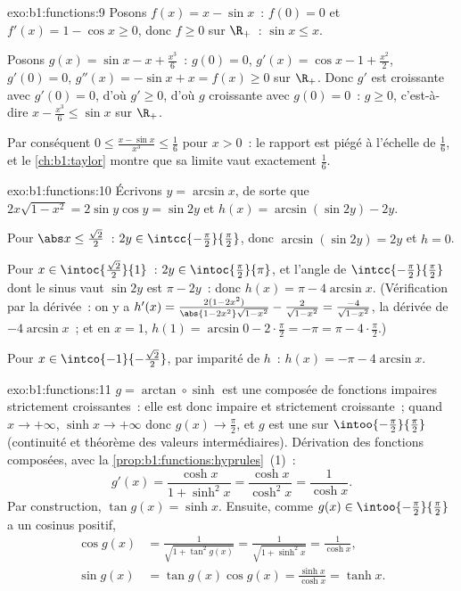 \begin{solution}{exo:b1:functions:9}
Posons $f(x) = x - \sin x$~: $f(0) = 0$ et $f'(x) = 1 - \cos x \geq
0$, donc $f \geq 0$ sur $\R_+$~: $\sin x \leq x$.

Posons $g(x) = \sin x - x + \frac{x^3}{6}$~: $g(0) = 0$, $g'(x) =
\cos x - 1 + \frac{x^2}{2}$, $g'(0) = 0$, $g''(x) = -\sin x + x =
f(x) \geq 0$ sur $\R_+$. Donc $g'$ est croissante avec $g'(0) = 0$,
d'où $g' \geq 0$, d'où $g$ croissante avec $g(0) = 0$~: $g \geq 0$,
c'est-à-dire $x - \frac{x^3}{6} \leq \sin x$ sur $\R_+$.

Par conséquent $0 \leq \frac{x - \sin x}{x^3} \leq \frac 16$ pour
$x > 0$~: le rapport est piégé à l'échelle de $\frac16$, et le
\cref{ch:b1:taylor} montre que sa limite vaut exactement $\frac 16$.
\end{solution}

\begin{solution}{exo:b1:functions:10}
Écrivons $y = \arcsin x$, de sorte que $2x\sqrt{1 - x^2} = 2\sin y\cos
y = \sin 2y$ et $h(x) = \arcsin(\sin 2y) - 2y$.

Pour $\abs x \leq \frac{\sqrt 2}{2}$~: $2y \in
\intcc{-\frac\pi2}{\frac\pi2}$, donc $\arcsin(\sin 2y) = 2y$ et
$h = 0$.

Pour $x \in \intoc{\frac{\sqrt 2}{2}}{1}$~: $2y \in
\intoc{\frac\pi2}{\pi}$, et l'angle de
$\intcc{-\frac\pi2}{\frac\pi2}$ dont le sinus vaut $\sin 2y$ est
$\pi - 2y$~: donc $h(x) = \pi - 4\arcsin x$. (Vérification par la
dérivée~: on y a
$h'(x) = \frac{2(1 - 2x^2)}{\abs{1 - 2x^2}\sqrt{1 - x^2}} -
\frac{2}{\sqrt{1-x^2}} = \frac{-4}{\sqrt{1 - x^2}}$, la dérivée
de $-4\arcsin x$~; et en $x = 1$, $h(1) = \arcsin 0 - 2\cdot\frac\pi2
= -\pi = \pi - 4\cdot\frac\pi2$.)

Pour $x \in \intco{-1}{-\frac{\sqrt 2}{2}}$, par imparité de $h$~:
$h(x) = -\pi - 4\arcsin x$.
\end{solution}

\begin{solution}{exo:b1:functions:11}
$g = \arctan \circ \sinh$ est une composée de fonctions impaires
strictement croissantes~: elle est donc impaire et strictement
croissante~; quand $x \to +\infty$, $\sinh x \to +\infty$ donc
$g(x) \to \frac\pi2$, et $g$ est une  sur
$\intoo{-\frac\pi2}{\frac\pi2}$ (continuité et théorème des valeurs
intermédiaires). Dérivation des fonctions composées, avec la
\cref{prop:b1:functions:hyprules}~(1)~:
\[
g'(x) = \frac{\cosh x}{1 + \sinh^2 x} = \frac{\cosh x}{\cosh^2 x}
= \frac{1}{\cosh x} .
\]
Par construction, $\tan g(x) = \sinh x$. Ensuite, comme $g(x) \in
\intoo{-\frac\pi2}{\frac\pi2}$ a un cosinus positif,
\begin{align*}
\cos g(x) &= \frac{1}{\sqrt{1 + \tan^2 g(x)}}
= \frac{1}{\sqrt{1 + \sinh^2 x}} = \frac{1}{\cosh x},\\
\sin g(x) &= \tan g(x) \cos g(x) = \frac{\sinh x}{\cosh x} = \tanh x .
\end{align*}
\end{solution}

